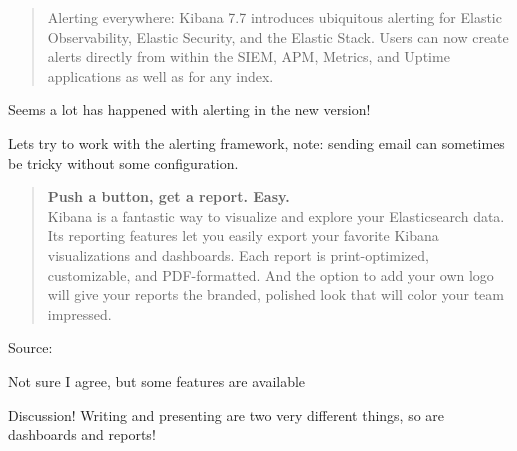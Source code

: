 \documentclass[Screen16to9,17pt]{foils}
\begin{document}
\begin{list2}
\item {\footnotesize{}}
\item {\footnotesize{}}
\item {\footnotesize{}}
\end{list2}




\begin{quote}
Alerting everywhere: Kibana 7.7 introduces ubiquitous alerting for Elastic Observability, Elastic Security, and the Elastic Stack. Users can now create alerts directly from within the SIEM, APM, Metrics, and Uptime applications as well as for any index.
\end{quote}

\begin{list2}
\item Seems a lot has happened with alerting in the new version!
\item Lets try to work with the alerting framework, note: sending email can sometimes be tricky without some configuration.
\end{list2}





\begin{quote}{\bf
Push a button, get a report. Easy.}\\
Kibana is a fantastic way to visualize and explore your Elasticsearch data. Its reporting features let you easily export your favorite Kibana visualizations and dashboards. Each report is print-optimized, customizable, and PDF-formatted. And the option to add your own logo will give your reports the branded, polished look that will color your team impressed.
\end{quote}
Source: 


\begin{list2}
\item Not sure I agree, but some features are available
\item Discussion! Writing and presenting are two very different things, so are dashboards and reports!
\end{list2}
\end{document}
